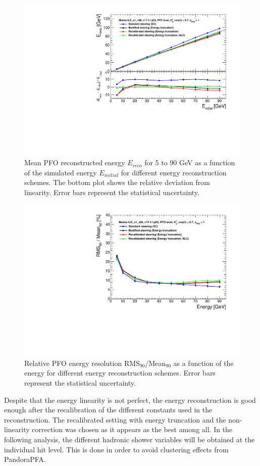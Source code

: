 \begin{figure}[htbp!]
  \centering
  \includegraphics[width=0.7\linewidth]{../Thesis_Plots/ILD/NoSmearing/Plots_Comparison/Comparison_linearity_Curves_PFO}
  \caption{Mean PFO reconstructed energy $E_{reco}$ for 5 to 90 GeV \kzeroL{} as a function of the simulated energy $E_{initial}$ for different energy reconstruction schemes. The bottom plot shows the relative deviation from linearity. Error bars represent the statistical uncertainty.} \label{fig:linpfo}
\end{figure}

\begin{figure}[htbp!]
  \centering
  \includegraphics[width=0.7\linewidth]{../Thesis_Plots/ILD/NoSmearing/Plots_Comparison/Comparison_resolution_Curves_PFO}
  \caption{Relative PFO energy resolution RMS$_{90}$/Mean$_{90}$ as a function of the energy for different energy reconstruction schemes. Error bars represent the statistical uncertainty.} \label{fig:resopfo}
\end{figure}

Despite that the energy linearity is not perfect, the energy reconstruction is good enough after the recalibration of the different constants used in the reconstruction. The recalibrated setting with energy truncation and the non-linearity correction was chosen as it appears as the best among all. In the following analysis, the different hadronic shower variables will be obtained at the individual hit level. This is done in order to avoid clustering effects from PandoraPFA.

